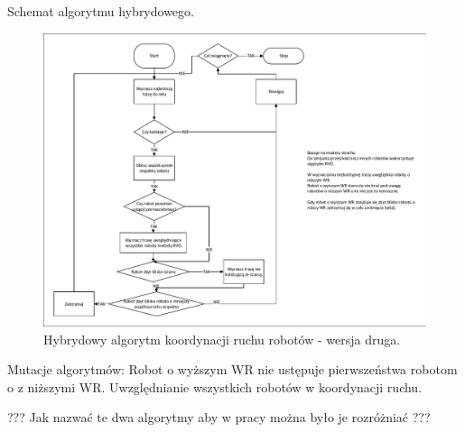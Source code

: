 Schemat algorytmu hybrydowego.

\begin{figure}[h]
	\centering
	\includegraphics[width=0.45\columnwidth]{img/FearNowy.pdf}
	\caption{Hybrydowy algorytm koordynacji ruchu robotów -  wersja druga.}
	\label{fig:FearNowy}
\end{figure} 


Mutacje algorytmów:
Robot o wyższym WR nie ustępuje pierwszeństwa robotom o z niższymi WR.
Uwzględnianie wszystkich robotów w koordynacji ruchu.

??? Jak nazwać te dwa algorytmy aby w pracy można było je rozróżniać ???

